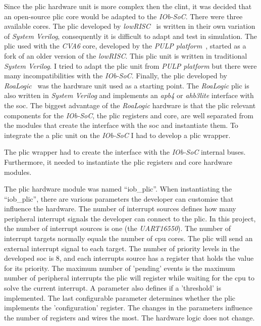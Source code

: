 Since the \acrshort{plic} hardware unit is more complex then the \acrshort{clint}, it was decided that an open-source \acrshort{plic} core would be adapted to the \textit{IOb-SoC}. There were three available cores. The \acrshort{plic} developed by \textit{lowRISC}~\cite{lowrisc_plic} is written in their own variation of \textit{System Verilog}, consequently it is difficult to adapt and test in simulation. The \acrshort{plic} used with the \textit{CVA6} core, developed by the \textit{PULP platform}~\cite{pulp_plic}, started as a fork of an older version of the \textit{lowRISC}. This \acrshort{plic} unit is written in traditional \textit{System Verilog}. I tried to adapt the \acrshort{plic} unit from \textit{PULP platform} but there were many incompatibilities with the \textit{IOb-SoC}. Finally, the \acrshort{plic} developed by \textit{RoaLogic}~\cite{roalogic_plic} was the hardware unit used as a starting point. The \textit{RoaLogic} \acrshort{plic} is also written in \textit{System Verilog} and implements an \textit{apb4} or \textit{ahb3lite} interface with the \acrshort{soc}. The biggest advantage of the \textit{RoaLogic} hardware is that the \acrshort{plic} relevant components for the \textit{IOb-SoC}, the \acrshort{plic} registers and core, are well separated from the modules that create the interface with the \acrshort{soc} and instantiate them. To integrate the a \acrshort{plic} unit on the \textit{IOb-SoC} I had to develop a \acrshort{plic} wrapper.

The \acrshort{plic} wrapper had to create the interface with the \textit{IOb-SoC} internal buses. Furthermore, it needed to instantiate the \acrshort{plic} registers and core hardware modules.

The \acrshort{plic} hardware module was named \enquote{iob\_plic}. When instantiating the \enquote{iob\_plic}, there are various parameters the developer can customise that influence the hardware. The number of interrupt sources defines how many peripheral interrupt signals the developer can connect to the \acrshort{plic}. In this project, the number of interrupt sources is one (the \textit{UART16550}). The number of interrupt targets normally equals the number of \acrshort{cpu} cores. The \acrshort{plic} will send an external interrupt signal to each target. The number of priority levels in the developed \acrshort{soc} is 8, and each interrupts source has a register that holds the value for its priority. The maximum number of 'pending' events is the maximum number of peripheral interrupts the \acrshort{plic} will register while waiting for the \acrshort{cpu} to solve the current interrupt. A parameter also defines if a 'threshold' is implemented. The last configurable parameter determines whether the \acrshort{plic} implements the 'configuration' register. The changes in the parameters influence the number of registers and wires the most. The hardware logic does not change.

